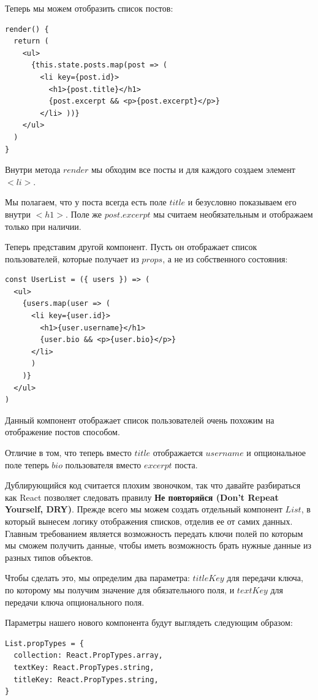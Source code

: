 Теперь мы можем отобразить список постов:

\begin{lstlisting}
render() {
  return (
    <ul>
      {this.state.posts.map(post => (
        <li key={post.id}>
          <h1>{post.title}</h1>
          {post.excerpt && <p>{post.excerpt}</p>}
        </li> ))}
    </ul> 
  )
}
\end{lstlisting}

Внутри метода $render$ мы обходим все посты и для каждого создаем элемент $<li>$.

Мы полагаем, что у поста всегда есть поле $title$ и безусловно показываем его внутри $<h1>$. Поле же $post.excerpt$ мы считаем необязательным и отображаем только при наличии.

Теперь представим другой компонент. Пусть он отображает список пользователей, которые получает из $props$, а не из собственного состояния:

\begin{lstlisting}
const UserList = ({ users }) => (
  <ul>
    {users.map(user => (
      <li key={user.id}>
        <h1>{user.username}</h1>
        {user.bio && <p>{user.bio}</p>}
      </li>
      )
    )} 
  </ul>
)
\end{lstlisting}

Данный компонент отображает список пользователей очень похожим на отображение постов способом.

Отличие в том, что теперь вместо $title$ отображается $username$ и опциональное поле теперь $bio$ пользователя вместо $excerpt$ поста. 

Дублирующийся код считается плохим звоночком, так что давайте разбираться как React позволяет следовать правилу \textbf{Не повторяйся (Don't Repeat Yourself, DRY)}. Прежде всего мы можем создать отдельный компонент $List$, в который вынесем логику отображения списков, отделив ее от самих данных. Главным требованием является возможность передать ключи полей по которым мы сможем получить данные, чтобы иметь возможность брать нужные данные из разных типов объектов.

Чтобы сделать это, мы определим два параметра: $titleKey$ для передачи ключа, по которому мы получим значение для  обязательного поля, и $textKey$ для передачи ключа опционального поля.

Параметры нашего нового компонента будут выглядеть следующим образом:

\begin{lstlisting}
List.propTypes = {
  collection: React.PropTypes.array,
  textKey: React.PropTypes.string,
  titleKey: React.PropTypes.string,
}
\end{lstlisting}

